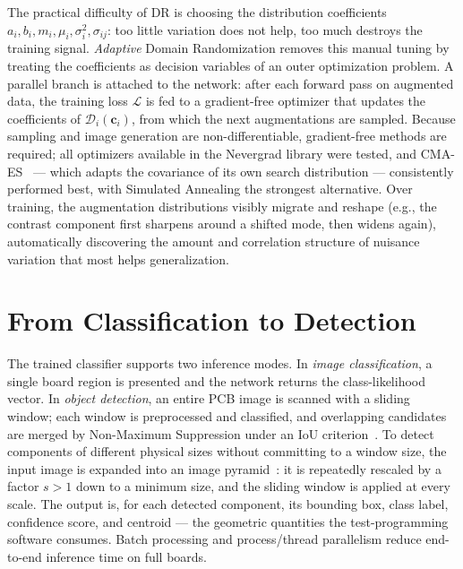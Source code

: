 \documentclass[10pt,twocolumn,a4paper]{article}
\begin{document}
The practical difficulty of DR is choosing the distribution coefficients $a_i, b_i, m_i, \mu_i, \sigma_i^2, \sigma_{ij}$: too little variation does not help, too much destroys the training signal. \emph{Adaptive} Domain Randomization removes this manual tuning by treating the coefficients as decision variables of an outer optimization problem. A parallel branch is attached to the network: after each forward pass on augmented data, the training loss $\mathcal{L}$ is fed to a gradient-free optimizer that updates the coefficients of $\mathcal{D}_i(\mathbf{c}_i)$, from which the next augmentations are sampled. Because sampling and image generation are non-differentiable, gradient-free methods are required; all optimizers available in the Nevergrad library were tested, and CMA-ES~\cite{augerhansen2012cma} --- which adapts the covariance of its own search distribution --- consistently performed best, with Simulated Annealing the strongest alternative. Over training, the augmentation distributions visibly migrate and reshape (e.g., the contrast component first sharpens around a shifted mode, then widens again), automatically discovering the amount and correlation structure of nuisance variation that most helps generalization.

\section{From Classification to Detection}
The trained classifier supports two inference modes. In \emph{image classification}, a single board region is presented and the network returns the class-likelihood vector. In \emph{object detection}, an entire PCB image is scanned with a sliding window; each window is preprocessed and classified, and overlapping candidates are merged by Non-Maximum Suppression under an IoU criterion~\cite{lin2014coco}. To detect components of different physical sizes without committing to a window size, the input image is expanded into an image pyramid~\cite{adelson1984pyramid}: it is repeatedly rescaled by a factor $s>1$ down to a minimum size, and the sliding window is applied at every scale. The output is, for each detected component, its bounding box, class label, confidence score, and centroid --- the geometric quantities the test-programming software consumes. Batch processing and process/thread parallelism reduce end-to-end inference time on full boards.
\end{document}
